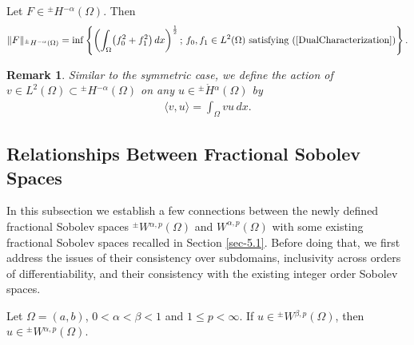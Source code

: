 \documentclass[leqno,final]{siamltex}
\numberwithin{equation}{section}
\newtheorem{remark}{Remark}[section]
\renewcommand{\(}{\bigl(}
\renewcommand{\)}{\bigr)}
\begin{document}
   \begin{proposition}
  Let $F \in {^{\pm}}{H}{^{-\alpha}}(\Omega)$. Then 
   \begin{align}
       \|F\|_{{^{\pm}}{H}{^{-\alpha}}(\Omega)} = \inf \left\{ \left( \int_{\Omega} \bigl(f_0^2 + f_1^2 \bigr)\, dx  \right)^{\frac12};\, f_0 , f_1 \in L^{2}(\Omega)\text{ satisfying } (\ref{DualCharacterization}) \right\}. 
   \end{align}
   \end{proposition}
   
   \begin{remark}
   Similar to the symmetric case, we define the action of $v \in L^{2}(\Omega) \subset {^{\pm}}{H}{^{-\alpha}}(\Omega)$ on any $u \in {^{\pm}}{\mathring{H}}{^{\alpha}}(\Omega)$ by 
   \begin{align}
       \langle v , u \rangle = \int_{\Omega} vu \,dx.
   \end{align}
   \end{remark}
           
    \subsection{Relationships Between Fractional Sobolev Spaces}\label{sec-4.6}
    In this subsection we establish a few connections between the newly defined fractional Sobolev
    spaces ${^{\pm}}{W}{^{\alpha,p}}(\Omega)$ and ${W}^{\alpha,p}(\Omega)$ with some existing fractional Sobolev spaces recalled in Section \ref{sec-5.1}. Before doing that, we first address the issues of their consistency over subdomains, inclusivity across orders of differentiability, and their consistency with the existing integer order Sobolev spaces.
    
    \begin{proposition}
        Let $\Omega = (a,b)$, $0 < \alpha < \beta < 1$ and $1 \leq p < \infty$. If $u \in {^{\pm}}{W}{^{\beta,p}}(\Omega)$, then $ u\in {^{\pm}}{W}{^{\alpha,p}}(\Omega)$. 
    \end{proposition}
    
\end{document}
